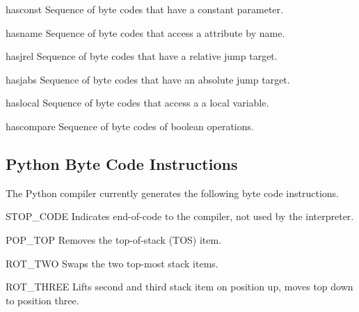 \begin{datadesc}{hasconst}
Sequence of byte codes that have a constant parameter.
\end{datadesc}

\begin{datadesc}{hasname}
Sequence of byte codes that access a attribute by name.
\end{datadesc}

\begin{datadesc}{hasjrel}
Sequence of byte codes that have a relative jump target.
\end{datadesc}

\begin{datadesc}{hasjabs}
Sequence of byte codes that have an absolute jump target.
\end{datadesc}

\begin{datadesc}{haslocal}
Sequence of byte codes that access a a local variable.
\end{datadesc}

\begin{datadesc}{hascompare}
Sequence of byte codes of boolean operations.
\end{datadesc}

\subsection{Python Byte Code Instructions}

The Python compiler currently generates the following byte code
instructions.

\renewcommand{\indexsubitem}{(byte code insns)}

\begin{funcdesc}{STOP_CODE}{}
Indicates end-of-code to the compiler, not used by the interpreter.
\end{funcdesc}

\begin{funcdesc}{POP_TOP}{}
Removes the top-of-stack (TOS) item.
\end{funcdesc}

\begin{funcdesc}{ROT_TWO}{}
Swaps the two top-most stack items.
\end{funcdesc}

\begin{funcdesc}{ROT_THREE}{}
Lifts second and third stack item on position up, moves top down
to position three.
\end{funcdesc}

